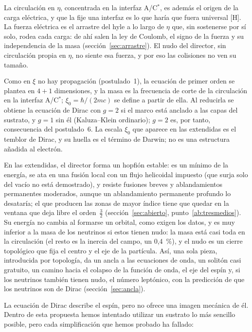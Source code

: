 \documentclass[11pt,a4paper]{article}
\newcommand{\st}[1]{\textup{[#1]}}
\newcommand{\Cst}{C\ensuremath{^{*}}}
\begin{document}
La circulación en $\eta$, concentrada en la interfaz A/\Cst, es además el origen de la carga eléctrica, y que la fije una interfaz es lo que haría que fuera universal \st{H}. La fuerza eléctrica es el arrastre del hyle a lo largo de $\eta$ que, sin sostenerse por sí solo, rodea cada carga: de ahí salen la ley de Coulomb, el signo de la fuerza y su independencia de la masa (sección~\ref{sec:arrastre}). El nudo del director, sin circulación propia en $\eta$, no siente esa fuerza, y por eso las colisiones no ven su tamaño.

Como en $\xi$ no hay propagación (postulado~1), la ecuación de primer orden se plantea en $4+1$ dimensiones, y la masa es la frecuencia de corte de la circulación en la interfaz A/\Cst; $\xi_0=\hbar/(2mc)$ se define a partir de ella. Al reducirla se obtiene la ecuación de Dirac con $g=2$ si el marco está anclado a las capas del sustrato, y $g=1$ sin él (Kaluza--Klein ordinario); $g=2$ es, por tanto, consecuencia del postulado~6. La escala $\xi_0$ que aparece en las extendidas es el temblor de Dirac, y su huella es el término de Darwin; no es una estructura añadida al electrón.

En las extendidas, el director forma un hopfión estable: es un mínimo de la energía, se ata en una fusión local con un flujo helicoidal impuesto (que surja solo del vacío no está demostrado), y resiste fusiones breves y ablandamientos permanentes moderados, aunque un ablandamiento permanente profundo lo desataría; el que producen las zonas de mayor índice tiene que quedar en la ventana que deja libre el orden~$\tfrac32$ (sección~\ref{sec:abierto}, punto~\ref{ab:tresmedios}). Su energía no cambia al formarse un orbital, como exigen los datos, y es muy inferior a la masa de los neutrinos si estos tienen nudo: la masa está casi toda en la circulación (el resto es la inercia del campo, un 0,4~\%), y el nudo es un cierre topológico que fija el centro y el eje de la partícula. Así, una sola pieza, introducida por topología, da un ancla a las ecuaciones de onda, un solitón casi gratuito, un camino hacia el colapso de la función de onda, el eje del espín y, si los neutrinos también tienen nudo, el número leptónico, con la predicción de que los neutrinos son de Dirac (sección~\ref{sec:ancla}).

La ecuación de Dirac describe el espín, pero no ofrece una imagen mecánica de él. Dentro de esta propuesta hemos intentado utilizar un sustrato lo más sencillo posible, pero cada simplificación que hemos probado ha fallado:
\end{document}
